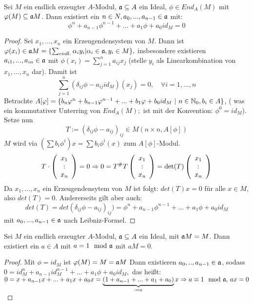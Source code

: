 \begin{sa}\label{11.14}
	Sei $M$ ein endlich erzeugter $A$-Modul, $\mathfrak{a} \subseteq A $ ein Ideal, $\phi \in End_A(M)$ mit $ \varphi(M) \subseteq \mathfrak{a} M$. Dann existiert ein $ n \in N, a_0,...,a_{n-1} \in \mathfrak{a} $ mit: 
	$$ \phi^{n} + a_{n-1}\phi^{n-1}+...+ a_1\phi + a_0id_M  = 0 $$
\end{sa} 
\begin{proof}
	Sei $x_1,...,x_n $ ein Erzeugendensystem von $M$. Dann ist $\varphi(x_i) \in \mathfrak{a} M = \{ \sum_{endl.} \alpha_i y_i | \alpha_i \in \mathfrak{a}, y_i \in M \},$ insbesondere existieren $a_{i1},...,a_{in} \in \mathfrak{a} $ mit $ \phi(x_i) = \sum_{j=1}^{n} a_{ij} x_j$ (stelle $y_i$ als Linearkombination von $x_1,...,x_n$ dar). Damit ist $$\sum_{j=1}^{n} ( \delta_{ij}\phi - a_{ij}id_M)(x_j) = 0, \quad \forall i=1,...,n $$ Betrachte $ A[\varphi] = \{b_n \varphi^n + b_{n-1}\varphi^{n-1} +...+b_1\varphi + b_0 id_M \ | \ n \in \mathbb{N}_0, b_i \in A \} $, ( was ein kommutativer Unterring von $End_A(M); $ ist mit der Konvention: $\phi^0 = id_M $). 
	Setze nun $$T:= ( \delta_{ij} \phi - a_{ij})_{ij} \in M(n \times n, A[\phi])$$
	$M $ wird via $ (\sum b_i \phi^i)x = \sum b_i \phi^i(x) $ zum $A[\phi]$-Modul. $$T \cdot \left( \begin{array}{c}x_1\\:\\ x_n\end{array} \right) = 0
	\Rightarrow  0 = T^{\#}T \left( \begin{array}{c}x_1\\:\\ x_n\end{array} \right)= \det(T)\left( \begin{array}{c}x_1\\:\\ x_n\end{array} \right)$$
	Da $x_1,...,x_n $ ein Erzeugendensytem von $M$ ist folgt: $ det(T) x = 0 $ für alle $x \in M$, also $det(T) = 0 $. Andererseits gilt aber auch: $$det(T) = det(\delta_{ij} \phi - a_{ij})_{ij}) = \phi^{n} + a_{n-1}\phi^{n-1}+...+ a_1\phi + a_0id_M$$ mit $a_0,...,a_{n-1} \in \mathfrak{a} $ nach Leibniz-Formel.
\end{proof}
\begin{fo} \label{11.15}
	Sei $M$ ein endlich erzeugter $A$-Modul, $\mathfrak{a} \subseteq A $ ein Ideal, mit $\mathfrak{a} M = M$. 
	Dann existiert ein $a \in A $ mit $ a = 1 \mod {\mathfrak{a}}$ mit $ aM = 0. $
\end{fo}
\begin{proof}
	Mit $ \phi = id_M$ ist $\varphi(M) = M = \mathfrak{a} M $ Dann existieren  $a_0,..,a_{n-1} \in \mathfrak{a}$, sodass $0 = id_M^{n} + a_{n-1}id_M^{n-1}+...+ a_1\phi + a_0id_M, $ das heißt: 
	$ 0 = x + a_{n-1}x +...+ a_1x+a_0x = \underbrace{(1+ a_{n-1}+...+a_1 +a_0)}_{:=a} x \Rightarrow a \equiv 1 \mod {\mathfrak{a}},\, ax =0 $
\end{proof}
